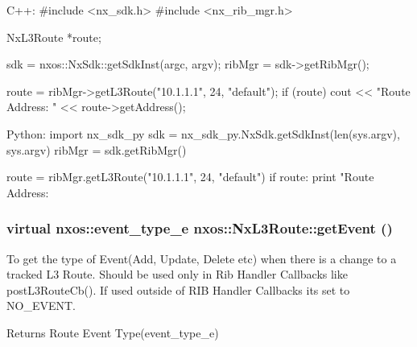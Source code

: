 \begin{DoxyCode}
  C++:
       #include <nx_sdk.h>
       #include <nx_rib_mgr.h>

       NxL3Route    *route;

       sdk = nxos::NxSdk::getSdkInst(argc, argv);
       ribMgr = sdk->getRibMgr();

       route = ribMgr->getL3Route("10.1.1.1", 24, "default");
       if (route) {
           cout << "Route Address: " << route->getAddress();
       }

  Python:
       import nx_sdk_py
       sdk = nx_sdk_py.NxSdk.getSdkInst(len(sys.argv), sys.argv)
       ribMgr = sdk.getRibMgr()

       route = ribMgr.getL3Route("10.1.1.1", 24, "default")
       if route:
          print "Route Address: %
\end{DoxyCode}
 \hypertarget{classnxos_1_1NxL3Route_a9ca0b236a35cc616753e09e620b6b02f}{
\subsubsection[{getEvent}]{\setlength{\rightskip}{0pt plus 5cm}virtual nxos::event\_\-type\_\-e nxos::NxL3Route::getEvent ()}}
\label{classnxos_1_1NxL3Route_a9ca0b236a35cc616753e09e620b6b02f}
To get the type of Event(Add, Update, Delete etc) when there is a change to a tracked L3 Route. Should be used only in Rib Handler Callbacks like postL3RouteCb(). If used outside of RIB Handler Callbacks its set to NO\_\-EVENT.

\begin{DoxyReturn}{Returns}
Route Event Type(event\_\-type\_\-e)
\end{DoxyReturn}

